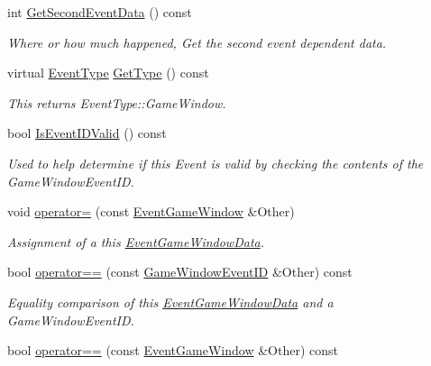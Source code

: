 \begin{DoxyCompactItemize}
int \hyperlink{classphys_1_1EventGameWindow_a477ef27390df3efa13cc37499e841f06}{GetSecondEventData} () const 
\begin{DoxyCompactList}\small\item\em Where or how much happened, Get the second event dependent data. \item\end{DoxyCompactList}\item 
virtual \hyperlink{classphys_1_1EventBase_a5e6a8564e127f654123f0bf6a2751923}{EventType} \hyperlink{classphys_1_1EventGameWindow_ab43a924a6c347823b0af51145974e297}{GetType} () const 
\begin{DoxyCompactList}\small\item\em This returns EventType::GameWindow. \item\end{DoxyCompactList}\item 
bool \hyperlink{classphys_1_1EventGameWindow_a9717be3e8429e0477be014ac57aa3679}{IsEventIDValid} () const 
\begin{DoxyCompactList}\small\item\em Used to help determine if this Event is valid by checking the contents of the GameWindowEventID. \item\end{DoxyCompactList}\item 
void \hyperlink{classphys_1_1EventGameWindow_a730e2b5fd13cc23cdc56351880895f04}{operator=} (const \hyperlink{classphys_1_1EventGameWindow}{EventGameWindow} \&Other)
\begin{DoxyCompactList}\small\item\em Assignment of a this \hyperlink{classphys_1_1EventGameWindowData}{EventGameWindowData}. \item\end{DoxyCompactList}\item 
bool \hyperlink{classphys_1_1EventGameWindow_abd3028a9c35ca2f5fd24e6b901054f24}{operator==} (const \hyperlink{classphys_1_1EventGameWindow_a45225255070513d3cff88cdfea25cc09}{GameWindowEventID} \&Other) const 
\begin{DoxyCompactList}\small\item\em Equality comparison of this \hyperlink{classphys_1_1EventGameWindowData}{EventGameWindowData} and a GameWindowEventID. \item\end{DoxyCompactList}\item 
bool \hyperlink{classphys_1_1EventGameWindow_a5b73127941980949fe3be1ded2a4cd34}{operator==} (const \hyperlink{classphys_1_1EventGameWindow}{EventGameWindow} \&Other) const 

\end{DoxyCompactItemize}
